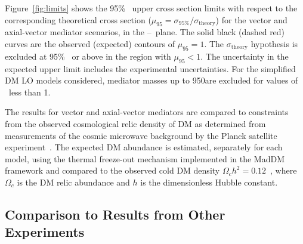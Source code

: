 Figure~\ref{fig:limits} shows the 95\% \CL\ upper cross section limits with respect to the corresponding theoretical cross section ($\mu_{95}= \sigma_{95\%}/\sigma_{\text{theory}}$) for the  vector and axial-vector mediator scenarios, in the \mmed--\mdm\ plane. 
The solid black (dashed red) curves are the observed (expected) contours of $\mu_{95} = 1$. 
The $\sigma_{\text{theory}}$ hypothesis is excluded at 95\% \CL\ or above in the region with $\mu_{95} < 1$. 
The uncertainty in the expected upper limit includes the experimental uncertainties. 
For the simplified DM LO models considered, mediator masses up to 950\GeV are excluded for values of \mdm\ less than 1\GeV.

The results for vector and axial-vector mediators are compared to constraints
from the observed cosmological relic density of DM as determined from measurements of the cosmic microwave background by the Planck satellite experiment~\cite{Ade:2015xua}.
The expected DM abundance is estimated, separately for each model, using the thermal freeze-out mechanism implemented in the {\sc MadDM}~\cite{Backovic:2013dpa} framework and  compared to the observed cold DM density $\Omega_c h^2=0.12$~\cite{Ade:2015xua}, where $\Omega_c$ is the DM relic abundance and $h$ is the dimensionless Hubble constant.

\subsection{Comparison to Results from Other Experiments}
\label{sec:comparison}

